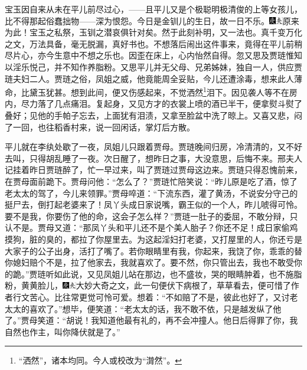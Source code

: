 宝玉因自来从未在平儿前尽过心，------且平儿又是个极聪明极清俊的上等女孩儿，比不得那起俗蠢拙物------深为恨怨。今日是金钏儿的生日，故一日不乐。{\includegraphics[width=3mm]{../Images/00004}\includegraphics[width=3mm]{../Images/00012}\footnotesize \kaishu 原来为此！宝玉之私祭，玉钏之潜哀俱针对矣。然于此刻补明，又一法也。真千变万化之文，万法具备，毫无脱漏，真好书也。}不想落后闹出这件事来，竟得在平儿前稍尽片心，亦今生意中不想之乐也。因歪在床上，心内怡然自得。忽又思及贾琏惟知以淫乐悦己，并不知作养脂粉。又思平儿并无父母、兄弟姊妹，独自一人，供应贾琏夫妇二人。贾琏之俗，凤姐之威，他竟能周全妥贴，今儿还遭涂毒，想来此人薄命，比黛玉犹甚。想到此间，便又伤感起来，不觉洒然\footnote{“洒然”，诸本均同。今人或校改为“潸然”。}泪下。因见袭人等不在房内，尽力落了几点痛泪。复起身，又见方才的衣裳上喷的酒已半干，便拿熨斗熨了叠好；见他的手帕子忘去，上面犹有泪渍，又拿至脸盆中洗了晾上。又喜又悲，闷了一回，也往稻香村来，说一回闲话，掌灯后方散。

平儿就在李纨处歇了一夜，凤姐儿只跟着贾母。贾琏晚间归房，冷清清的，又不好去叫，只得胡乱睡了一夜。次日醒了，想昨日之事，大没意思，后悔不来。邢夫人记挂着昨日贾琏醉了，忙一早过来，叫了贾琏过贾母这边来。贾琏只得忍愧前来，在贾母面前跪下。贾母问他：“怎么了？”贾琏忙陪笑说：“昨儿原是吃了酒，惊了老太太的驾了，今儿来领罪。”贾母啐道：“下流东西，灌了黄汤，不说安分守己的挺尸去，倒打起老婆来了！凤丫头成日家说嘴，霸王似的一个人，昨儿唬得可怜。要不是我，你要伤了他的命，这会子怎么样？”贾琏一肚子的委屈，不敢分辩，只认不是。贾母又道：“那凤丫头和平儿还不是个美人胎子？你还不足！成日家偷鸡摸狗，脏的臭的，都拉了你屋里去。为这起淫妇打老婆，又打屋里的人，你还亏是大家子的公子出身，活打了嘴了。若你眼睛里有我，你起来，我饶了你，乖乖的替你媳妇赔个不是，拉了他家去，我就喜欢了。要不然，你只管出去，我也不敢受你的跪。”贾琏听如此说，又见凤姐儿站在那边，也不盛妆，哭的眼睛肿着，也不施脂粉，黄黄脸儿，{\includegraphics[width=3mm]{../Images/00004}\includegraphics[width=3mm]{../Images/00012}\footnotesize \kaishu 大妙大奇之文，此一句便伏下病根了，草草看去，便可惜了作者行文苦心。}比往常更觉可怜可爱。想着：“不如赔了不是，彼此也好了，又讨老太太的喜欢了。”想毕，便笑道：“老太太的话，我不敢不依，只是越发纵了他了。”贾母笑道：“胡说！我知道他最有礼的，再不会冲撞人。他日后得罪了你，我自然也作主，叫你降伏就是了。”

